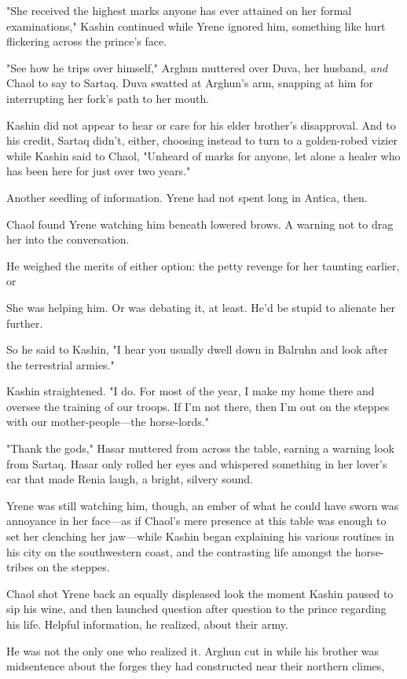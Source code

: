 "She received the highest marks anyone has ever attained on her formal examinations," Kashin continued while Yrene ignored him, something like hurt flickering across the prince's face.

"See how he trips over himself," Arghun muttered over Duva, her husband, \emph{and} Chaol to say to Sartaq. Duva swatted at Arghun's arm, snapping at him for interrupting her fork's path to her mouth.

Kashin did not appear to hear or care for his elder brother's disapproval. And to his credit, Sartaq didn't, either, choosing instead to turn to a golden-robed vizier while Kashin said to Chaol, "Unheard of marks for anyone, let alone a healer who has been here for just over two years."

Another seedling of information. Yrene had not spent long in Antica, then.

Chaol found Yrene watching him beneath lowered brows. A warning not to drag her into the conversation.

He weighed the merits of either option: the petty revenge for her taunting earlier, or 

She was helping him. Or was debating it, at least. He'd be stupid to alienate her further.

So he said to Kashin, "I hear you usually dwell down in Balruhn and look after the terrestrial armies."

Kashin straightened. "I do. For most of the year, I make my home there and oversee the training of our troops. If I'm not there, then I'm out on the steppes with our mother-people---the horse-lords."

"Thank the gods," Hasar muttered from across the table, earning a warning look from Sartaq. Hasar only rolled her eyes and whispered something in her lover's ear that made Renia laugh, a bright, silvery sound.

Yrene was still watching him, though, an ember of what he could have sworn was annoyance in her face---as if Chaol's mere presence at this table was enough to set her clenching her jaw---while Kashin began explaining his various routines in his city on the southwestern coast, and the contrasting life amongst the horse-tribes on the steppes.

Chaol shot Yrene back an equally displeased look the moment Kashin paused to sip his wine, and then launched question after question to the prince regarding his life. Helpful information, he realized, about their army.

He was not the only one who realized it. Arghun cut in while his brother was midsentence about the forges they had constructed near their northern climes,

